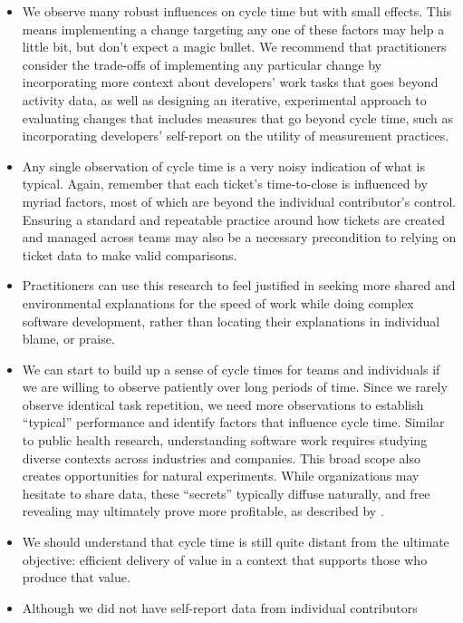 \documentclass[
  sn-mathphys-ay,
]{sn-jnl}
\providecommand{\tightlist}{%
  \setlength{\itemsep}{0pt}\setlength{\parskip}{0pt}}\usepackage{longtable,booktabs,array}
\begin{document}
\begin{itemize}
\tightlist
\item
  We observe many robust influences on cycle time but with small
  effects. This means implementing a change targeting any one of these
  factors may help a little bit, but don't expect a magic bullet. We
  recommend that practitioners consider the trade-offs of implementing
  any particular change by incorporating more context about developers'
  work tasks that goes beyond activity data, as well as designing an
  iterative, experimental approach to evaluating changes that includes
  measures that go beyond cycle time, such as incorporating developers'
  self-report on the utility of measurement practices.
\item
  Any single observation of cycle time is a very noisy indication of
  what is typical. Again, remember that each ticket's time-to-close is
  influenced by myriad factors, most of which are beyond the individual
  contributor's control. Ensuring a standard and repeatable practice
  around how tickets are created and managed across teams may also be a
  necessary precondition to relying on ticket data to make valid
  comparisons.
\item
  Practitioners can use this research to feel justified in seeking more
  shared and environmental explanations for the speed of work while
  doing complex software development, rather than locating their
  explanations in individual blame, or praise.
\item
  We can start to build up a sense of cycle times for teams and
  individuals if we are willing to observe patiently over long periods
  of time. Since we rarely observe identical task repetition, we need
  more observations to establish ``typical'' performance and identify
  factors that influence cycle time. Similar to public health research,
  understanding software work requires studying diverse contexts across
  industries and companies. This broad scope also creates opportunities
  for natural experiments. While organizations may hesitate to share
  data, these ``secrets'' typically diffuse naturally, and free
  revealing may ultimately prove more profitable, as described by
  \citet{vonhippelFreeRevealingPrivatecollective2006}.
\item
  We should understand that cycle time is still quite distant from the
  ultimate objective: efficient delivery of value in a context that
  supports those who produce that value.
\item
  Although we did not have self-report data from individual contributors

\end{itemize}
\end{document}
